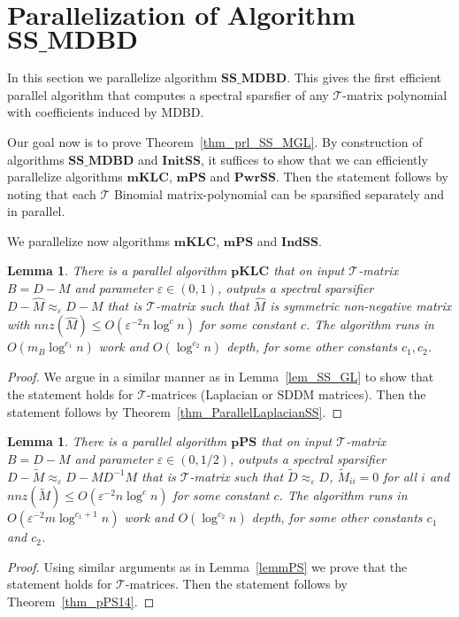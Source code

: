 \documentclass[11pt]{article}
\newcommand{\SDDM}{\mathrm{SDDM}}
\newcommand{\MDBD}{\mathrm{MDBD}}
\newcommand{\GL}{\mathcal{T}}
\newcommand{\mKLC}{\mathrm{\mathbf{mKLC}}}
\newcommand{\pKLC}{\mathrm{\mathbf{pKLC}}}
\newcommand{\mPS}{\mathrm{\mathbf{mPS}}}
\newcommand{\InitSS}{\mathrm{\mathbf{InitSS}}}
\newcommand{\IndSS}{\mathrm{\mathbf{IndSS}}}
\newcommand{\PwrSS}{\mathrm{\mathbf{PwrSS}}}
\newcommand{\SSMDBD}{\mathrm{\mathbf{SS\_MDBD}}}
\newcommand{\pPS}{\mathbf{pPS}}
\newcommand{\wD}{\widetilde{D}}
\newcommand{\wM}{\widetilde{M}}
\newcommand{\hM}{\widehat{M}}
\newcommand{\Di}{D^{-1}}
\newcommand{\eps}{\epsilon}
\renewcommand{\leq}{\leqslant}
\renewcommand{\eps}{\varepsilon}
\newtheorem{lem}[thm]{Lemma}
\numberwithin{thm}{section}
\begin{document}
\section{Parallelization of Algorithm $\SSMDBD$}\label{sec:effPrlAlg}

In this section we parallelize algorithm $\SSMDBD$. This gives the first efficient parallel algorithm that computes a spectral sparsfier of any $\GL$-matrix polynomial with coefficients induced by $\MDBD$.

Our goal now is to prove Theorem~\ref{thm_prl_SS_MGL}. By construction of algorithms $\SSMDBD$ and $\InitSS$, it suffices to show that we can efficiently parallelize algorithms $\mKLC$, $\mPS$ and $\PwrSS$. Then the statement follows by noting that each $\GL$ Binomial matrix-polynomial can be sparsified separately and in parallel.

We parallelize now algorithms $\mKLC$, $\mPS$ and $\IndSS$.

\begin{lem}\label{lem_pKLC}
There is a parallel algorithm $\pKLC$
that on input $\GL$-matrix $B=D-M$ and parameter
$\eps\in(0,1)$, outputs a spectral sparsifier $D-\hM\approx_{\eps}D-M$ that is $\GL$-matrix such that $\hM$
is symmetric non-negative matrix with $nnz(\hM)\leq O(\eps^{-2}n\log^{c} n)$ for some constant $c$. The algorithm runs in $O(m_{B}\log^{c_1}n)$ work and $O(\log^{c_2}n)$ depth, for some other constants $c_1,c_2$.
\end{lem}

\begin{proof}
We argue in a similar manner as in Lemma~\ref{lem_SS_GL} to show that the statement holds for $\GL$-matrices (Laplacian or $\SDDM$ matrices). Then the statement follows by Theorem~\ref{thm_ParallelLaplacianSS}.
\end{proof}

\begin{lem}\label{lem_pPS}
There is a parallel algorithm $\pPS$ that on input $\GL$-matrix $B=D-M$ and parameter $\eps\in(0,1/2)$, outputs a spectral sparsifier $D-\wM\approx_{\eps}D-M\Di M$ that is $\GL$-matrix such that $\wD\approx_{\eps}D$, $\wM_{ii}=0$ for all $i$ and $nnz(\wM)\leq O(\eps^{-2}n\log^{c}n)$ for some constant $c$. The algorithm runs in $O(\eps^{-2}m\log^{c_1+1}n)$ work and $O(\log^{c_2}n)$ depth, for some other constants $c_1$ and $c_2$.
\end{lem}

\begin{proof}
Using similar arguments as in Lemma~\ref{lemmPS} we prove that the statement holds for $\GL$-matrices. Then the statement follows by Theorem~\ref{thm_pPS14}.
\end{proof}
\end{document}
